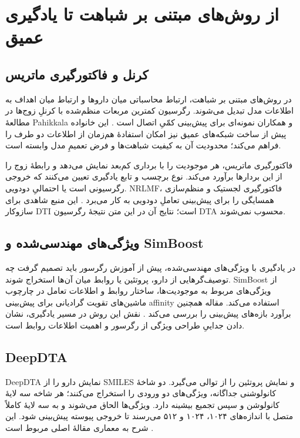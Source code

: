 \section{از روش‌های مبتنی بر شباهت تا یادگیری عمیق}
\label{sec:early-dti-dta}
\subsection{کرنل و فاکتورگیری ماتریس}
در روش‌های مبتنی بر شباهت، ارتباط محاسباتی میان داروها و ارتباط میان اهداف به اطلاعات مدل تبدیل می‌شوند. رگرسیون کمترین مربعات منظم‌شده با کرنلِ زوج‌ها در مطالعهٔ Pahikkala و همکاران نمونه‌ای برای پیش‌بینی کمّیِ اتصال است \cite{Pahikkala15RealisticDTA}. این خانواده پیش از ساخت شبکه‌های عمیق نیز امکان استفادهٔ هم‌زمان از اطلاعات دو طرف را فراهم می‌کند؛ محدودیت آن به کیفیت شباهت‌ها و فرض تعمیمِ مدل وابسته است.

فاکتورگیری ماتریس، هر موجودیت را با برداری کم‌بعد نمایش می‌دهد و رابطهٔ زوج را از این بردارها برآورد می‌کند. نوع برچسب و تابع یادگیری تعیین می‌کنند که خروجی رگرسیونی است یا احتمالیِ دودویی. NRLMF، فاکتورگیری لجستیک و منظم‌سازی همسایگی را برای پیش‌بینی تعاملِ دودویی به کار می‌برد \cite{Liu16NRLMF}. این منبع شاهدی برای سازوکار DTI است؛ نتایج آن در این متن نتیجهٔ رگرسیون DTA محسوب نمی‌شوند.

\subsection{ویژگی‌های مهندسی‌شده و SimBoost}
\label{sec:ml-dta}
در یادگیری با ویژگی‌های مهندسی‌شده، پیش از آموزش رگرسور باید تصمیم گرفت چه توصیف‌گرهایی از دارو، پروتئین یا روابط میان آن‌ها استخراج شوند. SimBoost از ویژگی‌های مربوط به موجودیت‌ها، ساختار روابط و اطلاعات تعامل در چارچوب ماشین‌های تقویت گرادیانی برای پیش‌بینی affinity استفاده می‌کند. مقاله همچنین برآورد بازه‌های پیش‌بینی را بررسی می‌کند \cite{He17SimBoost}. نقش این روش در مسیر یادگیری، نشان دادن جداییِ طراحی ویژگی از رگرسور و اهمیت اطلاعات روابط است.

\subsection{DeepDTA}
\label{sec:deep-dta}
DeepDTA نمایش دارو را از SMILES و نمایش پروتئین را از توالی می‌گیرد. دو شاخهٔ کانولوشنی جداگانه، ویژگی‌های دو ورودی را استخراج می‌کنند؛ هر شاخه سه لایهٔ کانولوشن و سپس تجمیع بیشینه دارد. ویژگی‌ها الحاق می‌شوند و به سه لایهٔ کاملاً متصل با اندازه‌های ۱۰۲۴، ۱۰۲۴ و ۵۱۲ می‌رسند تا خروجی پیوسته پیش‌بینی شود. این شرح به معماری مقالهٔ اصلی مربوط است \cite{Ozturk18DeepDTA}.

